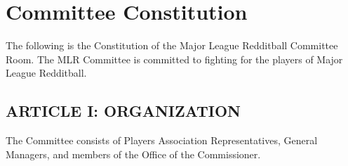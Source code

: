 
\section{Committee Constitution}
\label{sec:Committee Constitution}

The following is the Constitution of the Major League Redditball Committee Room. The MLR Committee is committed to fighting for the players of Major League Redditball.

\subsection{ARTICLE I: ORGANIZATION}
\begin{deepEnumerate}
    \item The Committee consists of Players Association Representatives, General Managers, and members of the Office of the Commissioner.
\end{deepEnumerate}
    
